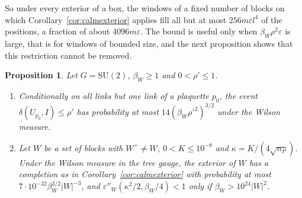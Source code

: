 \documentclass[11pt]{amsart}
\newtheorem{proposition}[theorem]{Proposition}
\theoremstyle{definition}
\theoremstyle{remark}
\numberwithin{equation}{section}
\newcommand{\SU}{\mathrm{SU}}
\begin{document}
So under every exterior of a box, the windows of a fixed number of blocks
on which Corollary~\ref{cor:calmexterior} applies fill all but at most
$256m\varepsilon l^4$ of the positions, a fraction of about $4096m\varepsilon$. The bound is useful only when
$\beta_W\rho^2\varepsilon$ is large, that is for windows of bounded size,
and the next proposition shows that this restriction cannot be removed.

\begin{proposition}\label{prop:calmrare}
Let $G=\SU(2)$, $\beta_W\ge1$ and $0<\rho'\le1$.
\begin{enumerate}[label=\textup{(\roman*)},leftmargin=*]
\item Conditionally on all links but one link of a plaquette $p_0$, the
event $\delta(U_{p_0},I)\le\rho'$ has probability at most $14(\beta_W
\rho'^2)^{3/2}$ under the Wilson measure.
\item Let $W$ be a set of blocks with $W^+\ne W$, $0<K\le10^{-8}$ and
$\kappa=K/(4\sqrt{n_P})$. Under the Wilson measure in the tree gauge, the
exterior of $W$ has a completion as in Corollary~\ref{cor:calmexterior} with
probability at most $7\cdot10^{-32}\beta_W^{3/2}|W|^{-3}$, and
$\varepsilon''_W(\kappa^2/2,\beta_W/4)<1$ only if $\beta_W>10^{24}|W|^2$.
\end{enumerate}
\end{proposition}
\end{document}
